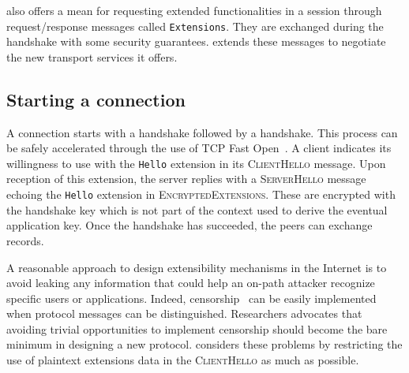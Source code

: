
\tls also offers a mean for requesting extended functionalities in a \tls session through
request/response messages called \tls \texttt{Extensions}. They are exchanged during
the \tls handshake with some security guarantees. 
\tcpls extends these messages to negotiate the new transport services it offers.

\subsection{Starting a \tcpls connection}

A \tcpls connection starts with a \tcp handshake followed by a \tls handshake.
This process can be safely accelerated through the use of TCP Fast Open~\cite{rfc7413}.
A \tcpls client
indicates its willingness to use \tcpls with the \tcpls \texttt{Hello} extension
in its \tls \textsc{ClientHello} message. Upon reception of this extension, the \tcpls server
replies with a \tls \textsc{ServerHello} message echoing the \tcpls \texttt{Hello} extension in \tls \textsc{EncryptedExtensions}.
These are encrypted with the handshake key which is not part of the context used to derive the eventual
application key. 
Once the \tls handshake has succeeded, the peers can exchange \tcpls records.

A reasonable approach to design extensibility mechanisms in the Internet
is to avoid leaking any information that could help an on-path attacker
recognize specific users or applications. Indeed, censorship~\cite{Morshed2017a,
	Gosain2017a,Chai2019a} can be easily implemented when protocol messages can be
distinguished. Researchers advocates that avoiding trivial opportunities to
implement censorship should become the bare minimum in designing a new protocol.
\tcpls%
considers these problems by restricting the use of
plaintext extensions data in the \textsc{ClientHello} as much as possible.



